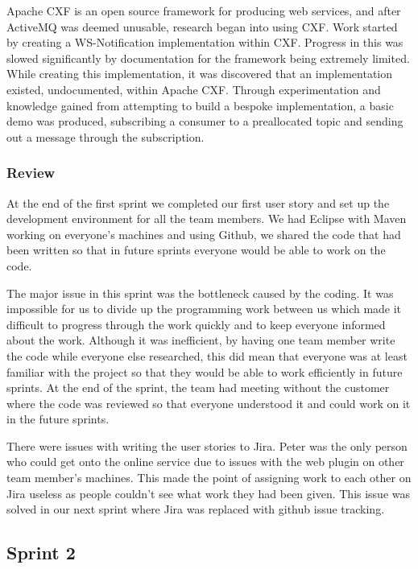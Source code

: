 \documentclass[a4paper, 12pt]{article}
\begin{document}
Apache CXF is an open source framework for producing web services, and after ActiveMQ was deemed unusable, research began into using CXF. Work started by creating a WS-Notification implementation within CXF. Progress in this was slowed significantly by documentation for the framework being extremely limited. While creating this implementation, it was discovered that an implementation existed, undocumented, within Apache CXF. Through experimentation and knowledge gained from attempting to build a bespoke implementation, a basic demo was produced, subscribing a consumer to a preallocated topic and sending out a message through the subscription.

\subsubsection{Review}

At the end of the first sprint we completed our first user story and set up the development environment for all the team members. We had Eclipse with Maven working on everyone's machines and using Github, we shared the code that had been written so that in future sprints everyone would be able to work on the code.

The major issue in this sprint was the bottleneck caused by the coding. It was impossible for us to divide up the programming work between us which made it difficult to progress through the work quickly and to keep everyone informed about the work. Although it was inefficient, by having one team member write the code while everyone else researched, this did mean that everyone was at least familiar with the project so that they would be able to work efficiently in future sprints. At the end of the sprint, the team had meeting without the customer where the code was reviewed so that everyone understood it and could work on it in the future sprints.

There were issues with writing the user stories to Jira. Peter was the only person who could get onto the online service due to issues with the web plugin on other team member's machines. This made the point of assigning work to each other on Jira useless as people couldn't see what work they had been given. This issue was solved in our next sprint where Jira was replaced with github issue tracking.

\subsection{Sprint 2}
\end{document}
